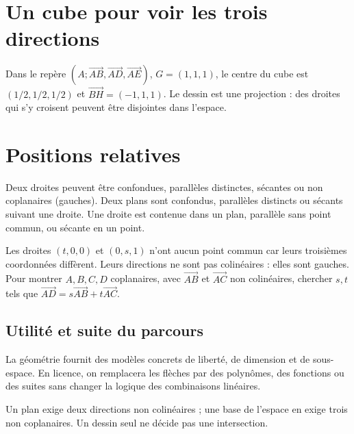 \documentclass[../cours_tle.tex]{subfiles}
\begin{document}
\section{Un cube pour voir les trois directions}
\begin{center}
\end{center}
Dans le repère $(A;\overrightarrow{AB},\overrightarrow{AD},\overrightarrow{AE})$, $G=(1,1,1)$, le centre du cube est $(1/2,1/2,1/2)$ et $\overrightarrow{BH}=(-1,1,1)$.
Le dessin est une projection : des droites qui s'y croisent peuvent être disjointes dans l'espace.
\section{Positions relatives}
Deux droites peuvent être confondues, parallèles distinctes, sécantes ou non coplanaires (gauches). Deux plans sont confondus, parallèles distincts ou sécants suivant une droite. Une droite est contenue dans un plan, parallèle sans point commun, ou sécante en un point.
\begin{exemple}
Les droites $(t,0,0)$ et $(0,s,1)$ n'ont aucun point commun car leurs troisièmes coordonnées diffèrent. Leurs directions ne sont pas colinéaires : elles sont gauches.
Pour montrer $A,B,C,D$ coplanaires, avec $\overrightarrow{AB}$ et $\overrightarrow{AC}$ non colinéaires, chercher $s,t$ tels que $\overrightarrow{AD}=s\overrightarrow{AB}+t\overrightarrow{AC}$.
\end{exemple}
\begin{finchapitre}
\section{Utilité et suite du parcours}
La géométrie fournit des modèles concrets de liberté, de dimension et de sous-espace. En licence, on remplacera les flèches par des polynômes, des fonctions ou des suites sans changer la logique des combinaisons linéaires.
\begin{retenir}
Un plan exige deux directions non colinéaires ; une base de l'espace en exige trois non coplanaires. Un dessin seul ne décide pas une intersection.
\end{retenir}
\end{finchapitre}
\end{document}
